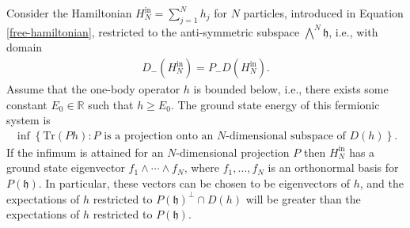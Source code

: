 \begin{theorem}\cite[p.~42]{SolNotes}
	Consider the Hamiltonian $H_N^{\mathrm{in}} = \sum_{j=1}^N h_j$ for $N$ particles,
	introduced in Equation \eqref{free-hamiltonian}, restricted to the anti-symmetric subspace
	$\bigwedge^N\mathfrak{h}$, i.e., with domain
	\begin{align*}
		D_-(H_N^{\mathrm{in}}) = P_-D(H_N^{\mathrm{in}}).
	\end{align*}
	Assume that the one-body operator $h$ is bounded below, i.e., there exists some constant
	$E_0\in\mathbb{R}$ such that $h\geq E_0$. The ground state energy of this fermionic system
	is
	\begin{align*}
		\inf \left\{ \mathrm{Tr}(Ph) : P \text{ is a projection onto an $N$-dimensional
		subspace of } D(h) \right\}.
	\end{align*}
	If the infimum is attained for an $N$-dimensional projection $P$ then $H_N^\mathrm{in}$ has
	a ground state eigenvector $f_1\wedge\cdots\wedge f_N$, where $f_1,\ldots,f_N$ is an
	orthonormal basis for $P(\mathfrak{h})$. In particular, these vectors can be chosen to be
	eigenvectors of $h$, and the expectations of $h$ restricted to $P(\mathfrak{h})^\perp\cap D(h)$
	will be greater than the expectations of $h$ restricted to $P(\mathfrak{h})$.
\end{theorem}
